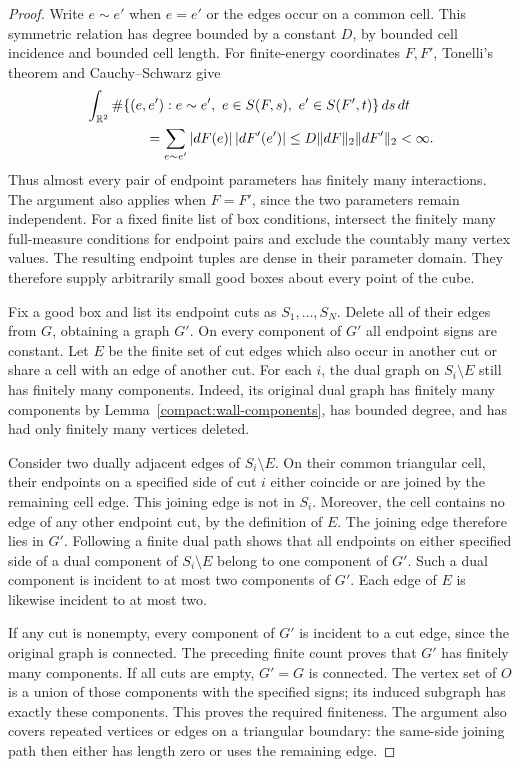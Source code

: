 \begin{proof}
Write $e\sim e'$ when $e=e'$ or the edges occur on a common cell.  This
symmetric relation has degree bounded by a constant $D$, by bounded
cell incidence and bounded cell length.  For finite-energy coordinates
$F,F'$, Tonelli's theorem and Cauchy--Schwarz give
\begin{align*}
 &\int_{\mathbb R^2}
 \#\{(e,e'):e\sim e',\ e\in S(F,s),\ e'\in S(F',t)\}\,ds\,dt\\
 &\hspace{15mm}=\sum_{e\sim e'}|dF(e)|\,|dF'(e')|
 \le D\|dF\|_2\|dF'\|_2<\infty.
\end{align*}
Thus almost every pair of endpoint parameters has finitely many
interactions.  The argument also applies when $F=F'$, since the two
parameters remain independent.  For a fixed finite list of box
conditions, intersect the finitely many full-measure conditions for
endpoint pairs and exclude the countably many vertex values.  The
resulting endpoint tuples are dense in their parameter domain.  They
therefore supply arbitrarily small good boxes about every point of
the cube.

Fix a good box and list its endpoint cuts as $S_1,\ldots,S_N$.
Delete all of their edges from $G$, obtaining a graph $G'$.  On every
component of $G'$ all endpoint signs are constant.  Let $E$ be the
finite set of cut edges which also occur in another cut or share a
cell with an edge of another cut.  For each $i$, the dual graph on
$S_i\setminus E$ still has finitely many components.  Indeed, its
original dual graph has finitely many components by
Lemma~\ref{compact:wall-components}, has bounded degree, and has had
only finitely many vertices deleted.

Consider two dually adjacent edges of $S_i\setminus E$.  On their
common triangular cell, their endpoints on a specified side of cut
$i$ either coincide or are joined by the remaining cell edge.  This
joining edge is not in $S_i$.  Moreover, the cell contains no edge of
any other endpoint cut, by the definition of $E$.  The joining edge
therefore lies in $G'$.  Following a finite dual path shows that all
endpoints on either specified side of a dual component of
$S_i\setminus E$ belong to one component of $G'$.  Such a dual
component is incident to at most two components of $G'$.  Each edge
of $E$ is likewise incident to at most two.

If any cut is nonempty, every component of $G'$ is incident to a cut
edge, since the original graph is connected.  The preceding finite
count proves that $G'$ has finitely many components.  If all cuts are
empty, $G'=G$ is connected.  The vertex set of $O$ is a union of those
components with the specified signs; its induced subgraph has exactly
these components.  This proves the required finiteness.  The argument
also covers repeated vertices or edges on a triangular boundary: the
same-side joining path then either has length zero or uses the
remaining edge.


\end{proof}

